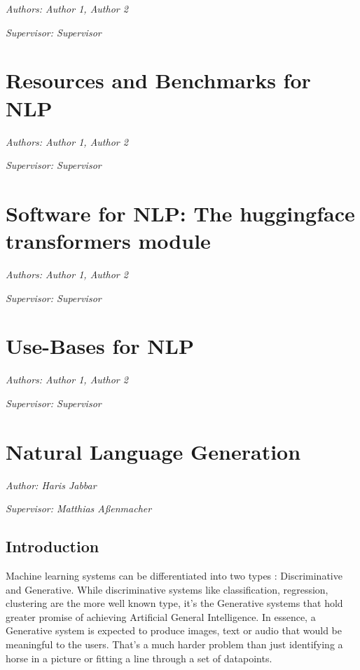 \documentclass[]{krantz}
\begin{document}
\emph{Authors: Author 1, Author 2}

\emph{Supervisor: Supervisor}

\hypertarget{resources-and-benchmarks-for-nlp}{%
\chapter{Resources and Benchmarks for NLP}\label{resources-and-benchmarks-for-nlp}}

\emph{Authors: Author 1, Author 2}

\emph{Supervisor: Supervisor}

\hypertarget{software-for-nlp-the-huggingface-transformers-module}{%
\chapter{Software for NLP: The huggingface transformers module}\label{software-for-nlp-the-huggingface-transformers-module}}

\emph{Authors: Author 1, Author 2}

\emph{Supervisor: Supervisor}

\hypertarget{use-bases-for-nlp}{%
\chapter{Use-Bases for NLP}\label{use-bases-for-nlp}}

\emph{Authors: Author 1, Author 2}

\emph{Supervisor: Supervisor}

\hypertarget{natural-language-generation}{%
\chapter{Natural Language Generation}\label{natural-language-generation}}

\emph{Author: Haris Jabbar}

\emph{Supervisor: Matthias Aßenmacher}

\hypertarget{introduction-2}{%
\section{Introduction}\label{introduction-2}}

Machine learning systems can be differentiated into two types : Discriminative and Generative. While discriminative systems like classification, regression, clustering are the more well known type, it's the Generative systems that hold greater promise of achieving Artificial General Intelligence. In essence, a Generative system is expected to produce images, text or audio that would be meaningful to the users. That's a much harder problem than just identifying a horse in a picture or fitting a line through a set of datapoints.
\end{document}
